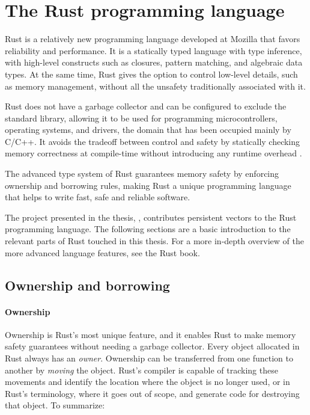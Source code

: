 \section{The Rust programming language}
\label{sec:rust}

Rust is a relatively new programming language developed at Mozilla that favors reliability and performance. It is a statically typed language with type inference, with high-level constructs such as closures, pattern matching, and algebraic data types. At the same time, Rust gives the option to control low-level details, such as memory management, without all the unsafety traditionally associated with it.

Rust does not have a garbage collector and can be configured to exclude the standard library, allowing it to be used for programming microcontrollers, operating systems, and drivers, the domain that has been occupied mainly by C/C++. It avoids the tradeoff between control and safety by statically checking memory correctness at compile-time without introducing any runtime overhead \cite{reed-patina}.

The advanced type system of Rust guarantees memory safety by enforcing ownership and borrowing rules, making Rust a unique programming language that helps to write fast, safe and reliable software.

The project presented in the thesis, \pvecrs{}, contributes persistent vectors to the Rust programming language. The following sections are a basic introduction to the relevant parts of Rust touched in this thesis. For a more in-depth overview of the more advanced language features, see the Rust book\cite{rust-book-2e}.

\subsection{Ownership and borrowing}

\paragraph{Ownership}
Ownership is Rust's most unique feature, and it enables Rust to make memory safety guarantees without needing a garbage collector. Every object allocated in Rust always has an \emph{owner}. Ownership can be transferred from one function to another by \emph{moving} the object. Rust's compiler is capable of tracking these movements and identify the location where the object is no longer used, or in Rust's terminology, where it goes out of scope, and generate code for destroying that object. To summarize:

